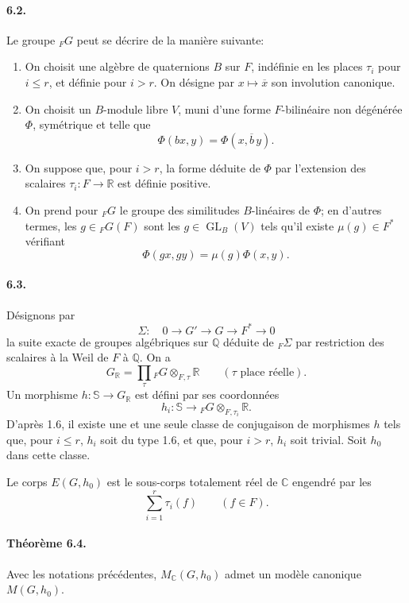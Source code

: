 \documentclass[10pt]{article}
\newcommand{\C}{\mathbb C}
\newcommand{\Q}{\mathbb Q}
\newcommand{\R}{\mathbb R}
\newcommand{\bS}{\mathbb S}
\newcommand{\GL}{\operatorname{GL}}
\newcommand{\MC}{M_{\C}}
\begin{document}
\paragraph{6.2.} Le groupe ${}_FG$ peut se décrire de la manière suivante:
\begin{enumerate}[label=(\alph*)]
\item On choisit une algèbre de quaternions $B$ sur $F$, indéfinie en les places $\tau_i$ pour $i\le r$, et définie pour $i>r$. On désigne par $x\mapsto\overline{x}$ son involution canonique.
\item On choisit un $B$-module libre $V$, muni d'une forme $F$-bilinéaire non dégénérée $\Phi$, symétrique et telle que
\[
\Phi(bx,y)=\Phi(x,\overline b\,y).
\]
\item On suppose que, pour $i>r$, la forme déduite de $\Phi$ par l'extension des scalaires $\tau_i:F\to\R$ est définie positive.
\item On prend pour ${}_FG$ le groupe des similitudes $B$-linéaires de $\Phi$; en d'autres termes, les $g\in{}_FG(F)$ sont les $g\in\GL_B(V)$ tels qu'il existe $\mu(g)\in F^*$ vérifiant
\[
\Phi(gx,gy)=\mu(g)\Phi(x,y).
\]
\end{enumerate}

\paragraph{6.3.} Désignons par
\[
\Sigma:\quad 0\longrightarrow G'\longrightarrow G\longrightarrow F^*\longrightarrow0
\]
la suite exacte de groupes algébriques sur $\Q$ déduite de ${}_F\Sigma$ par restriction des scalaires à la Weil de $F$ à $\Q$. On a
\[
\tag{6.3.1}
G_{\R}=\prod_{\tau}{}_FG\otimes_{F,\tau}\R
\qquad(\tau\text{ place réelle}).
\]
Un morphisme $h:\bS\to G_\R$ est défini par ses coordonnées
\[
h_i:\bS\longrightarrow {}_FG\otimes_{F,\tau_i}\R.
\]
D'après 1.6, il existe une et une seule classe de conjugaison de morphismes $h$ tels que, pour $i\le r$, $h_i$ soit du type 1.6, et que, pour $i>r$, $h_i$ soit trivial. Soit $h_0$ dans cette classe.

Le corps $E(G,h_0)$ est le sous-corps totalement réel de $\C$ engendré par les
\[
\sum_{i=1}^r\tau_i(f)\qquad(f\in F).
\]

\paragraph{Théorème 6.4.} Avec les notations précédentes, $\MC(G,h_0)$ admet un modèle canonique $M(G,h_0)$.
\end{document}
